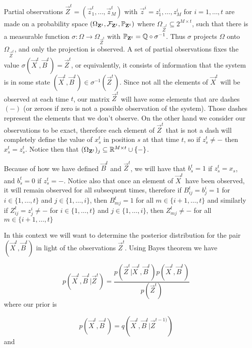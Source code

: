 Partial observations $\vec{Z}^t = (\vec{z}^t_1, \dots, \vec{z}^t_M)$ with $\vec{z}^i = z^i_1, \dots, z^i_M$ for $i = 1, \dots, t$ are made on a probability space $(\Omega_{\mathbf{Z}^t}, \mathcal{F}_{\mathbf{Z}^t}, \mathbb{P}_{\mathbf{Z}^t})$ where $\Omega_{\vec{Z}^t} \subseteq 2^{M \times t}$, such that there is a measurable function $\sigma : \Omega \rightarrow \Omega_{\vec{Z}^t}$ with $\mathbb{P}_{\mathbf{Z}^t} = \mathbb{Q} \circ \sigma^{-1}$. Thus $\sigma$ projects $\Omega$ onto $\Omega_{\vec{Z}^t}$, and only the projection is observed. A set of partial observations fixes the value $\sigma(\vec{X}^t, \vec{B}^t) = \vec{Z}^t$, or equivalently, it consists of information that the system is in some state $(\vec{X}^t, \vec{B}^t) \in \sigma^{-1}(\vec{Z}^t)$.
Since not all the elements of $\vec{X}^{t}$ will be observed at each time $t$, our matrix $\vec{Z}^{t}$ will have some elements that are dashes $(-)$ (or zeroes if zero is not a possible observation of the system). Those dashes represent the elements that we don't observe. On the other hand we consider our observations to be exact, therefore each element of $\vec{Z}^t$ that is not a dash will completely define the value of $x^t_s$ in position $s$ at that time $t$, so if $z^t_s \neq -$ then $x^t_s = z^t_s$. Notice then that $(\Omega_{\mathbf{Z}^t})_j \subseteq \mathbb R^{M \times t} \cup \{ - \}$.

Because of how we have defined $\vec{B}^t$ and $\vec{Z}^t$, we will have that $b_s^{t} = 1$ if $z_s^{t} = x_s$, and $b_s^{t} = 0$ if $z_s^{t} = -$. Notice also that once an element of $\vec{X}^t$ have been observed, it will remain observed for all subsequent times, therefore if $B_{ij}^{t} = b_j^{i} = 1$ for $i \in \{ 1, \ldots, t \}$ and $j \in \{ 1, \ldots, i \}$, then $B_{mj}^{t} = 1$ for all $m \in \{ i+1, \ldots, t \}$ and similarly if $Z_{ij}^{t} = z_j^{i} \neq -$ for $i \in \{ 1, \ldots, t \}$ and $j \in \{ 1, \ldots, i \}$, then $Z_{mj}^{t} \neq -$ for all $m \in \{ i+1, \ldots, t \}$

In this context we will want to determine the posterior distribution for the pair $(\vec{X}^t, \vec{B}^t)$ in light of the observations $\vec{Z}^t$. Using Bayes theorem we have

\begin{equation*}
    p(\vec{X}^t, \vec{B}^t | \vec{Z}^t) = \frac{p(\vec{Z}^t | \vec{X}^t, \vec{B}^t) p(\vec{X}^t, \vec{B}^t)}{p(\vec{Z}^t)}
\end{equation*}
where our prior is

\begin{equation*}
    p(\vec{X}^t, \vec{B}^t) = q(\vec{X}^t, \vec{B}^t | \vec{Z}^{t-1)})
\end{equation*} 
and


